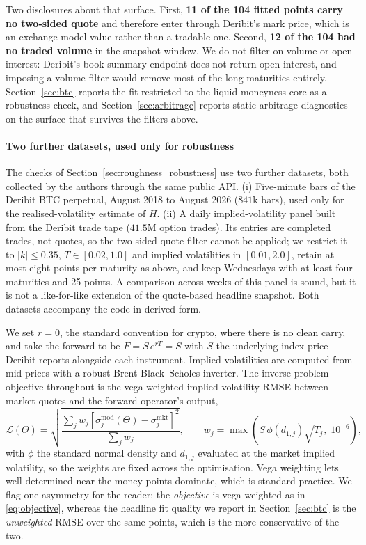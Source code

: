 \documentclass[preprint,12pt]{elsarticle}
\begin{document}
Two disclosures about that surface. First, \textbf{11 of the 104 fitted points
carry no two-sided quote} and therefore enter through Deribit's mark price,
which is an exchange model value rather than a tradable one. Second,
\textbf{12 of the 104 had no traded volume} in the snapshot window. We do not
filter on volume or open interest: Deribit's book-summary endpoint does not
return open interest, and imposing a volume filter would remove most of the long
maturities entirely. Section~\ref{sec:btc} reports the fit restricted to the
liquid moneyness core as a robustness check, and
Section~\ref{sec:arbitrage} reports static-arbitrage diagnostics on the surface
that survives the filters above.

\paragraph{Two further datasets, used only for robustness}
The checks of Section~\ref{sec:roughness_robustness} use two further datasets,
both collected by the authors through the same public API. (i) Five-minute bars
of the Deribit BTC perpetual, August 2018 to August 2026 ($841$k bars), used only
for the realised-volatility estimate of $H$. (ii) A daily implied-volatility
panel built from the Deribit trade tape ($41.5$M option trades). Its entries are
completed trades, not quotes, so the two-sided-quote filter cannot be applied; we
restrict it to $|k|\le0.35$, $T\in[0.02,1.0]$ and implied volatilities in
$[0.01,2.0]$, retain at most eight points per maturity as above, and keep
Wednesdays with at least four maturities and 25 points. A comparison across weeks
of this panel is sound, but it is not a like-for-like extension of the
quote-based headline snapshot. Both datasets accompany the code in derived form.

We set $r{=}0$, the standard convention for crypto, where there is no clean
carry, and take the forward to be $F=S\,e^{rT}=S$ with $S$ the underlying index
price Deribit reports alongside each instrument. Implied volatilities are
computed from mid prices with a robust Brent Black--Scholes inverter. The
inverse-problem objective throughout is the vega-weighted implied-volatility
RMSE between market quotes and the forward operator's output,
\begin{equation}
  \mathcal{L}(\Theta)=\sqrt{\frac{\sum_j w_j\left[\sigma^{\mathrm{mod}}_j(\Theta)
        -\sigma^{\mathrm{mkt}}_j\right]^2}{\sum_j w_j}},
  \qquad
  w_j=\max\!\left(S\,\phi(d_{1,j})\sqrt{T_j},\;10^{-6}\right),
  \label{eq:objective}
\end{equation}
with $\phi$ the standard normal density and $d_{1,j}$ evaluated at the market
implied volatility, so the weights are fixed across the optimisation. Vega
weighting lets well-determined near-the-money points dominate, which is standard
practice. We flag one asymmetry for the reader: the \emph{objective} is
vega-weighted as in \eqref{eq:objective}, whereas the headline fit quality we
report in Section~\ref{sec:btc} is the \emph{unweighted} RMSE over the same
points, which is the more conservative of the two.
\end{document}
